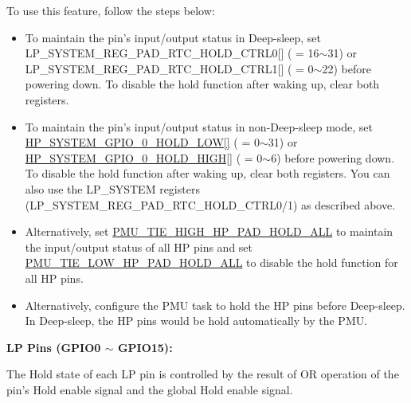 \documentclass[main\_\_EN.tex]{subfiles}
\begin{document}
{To use this feature, follow the steps below:

    \begin{itemize}
        \item To maintain the pin's input/output status in Deep-sleep, set LP\_SYSTEM\_REG\_PAD\_RTC\_HOLD\_CTRL0[] ( = 16$\sim$31) or LP\_SYSTEM\_REG\_PAD\_RTC\_HOLD\_CTRL1[] ( = 0$\sim$22) before powering down. To disable the hold function after waking up, clear both registers.
        \item To maintain the pin's input/output status in non-Deep-sleep mode, set \hyperref[fielddesc:HPSYSTEMGPIO0HOLDLOW]{HP\_SYSTEM\_GPIO\_0\_HOLD\_LOW[]} ( = 0$\sim$31) or \hyperref[fielddesc:HPSYSTEMGPIO0HOLDHIGH]{HP\_SYSTEM\_GPIO\_0\_HOLD\_HIGH[]} ( = 0$\sim$6) before powering down. To disable the hold function after waking up, clear both registers. You can also use the LP\_SYSTEM registers (LP\_SYSTEM\_REG\_PAD\_RTC\_HOLD\_CTRL0/1) as described above.
        \item Alternatively, set \hyperref[fielddesc:PMUTIEHIGHHPPADHOLDALL]{PMU\_TIE\_HIGH\_HP\_PAD\_HOLD\_ALL} to maintain the input/output status of all HP pins and set \hyperref[fielddesc:PMUTIELOWHPPADHOLDALL]{PMU\_TIE\_LOW\_HP\_PAD\_HOLD\_ALL} to disable the hold function for all HP pins.
        \item Alternatively, configure the PMU task to hold the HP pins before Deep-sleep. In Deep-sleep, the HP pins would be hold automatically by the PMU.
    \end{itemize}

\textbf{LP Pins (GPIO0 $\sim$ GPIO15):}

The Hold state of each LP pin is controlled by the result of OR operation of the pin's Hold enable signal and the global Hold enable signal.

}
\end{document}
